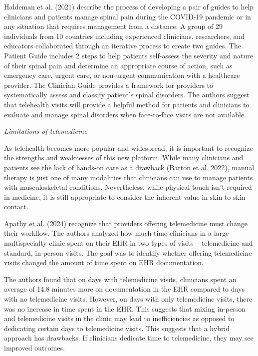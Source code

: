 \documentclass[
  letterpaper,
  DIV=11,
  numbers=noendperiod,
  oneside]{scrartcl}
\begin{document}
Haldeman et al. (2021) describe the process of developing a pair of
guides to help clinicians and patients manage spinal pain during the
COVID-19 pandemic or in any situation that requires management from a
distance. A group of 29 individuals from 10 countries including
experienced clinicians, researchers, and educators collaborated through
an iterative process to create two guides. The Patient Guide includes 2
steps to help patients self-assess the severity and nature of their
spinal pain and determine an appropriate course of action, such as
emergency care, urgent care, or non-urgent communication with a
healthcare provider. The Clinician Guide provides a framework for
providers to systematically assess and classify patient's spinal
disorders. The authors suggest that telehealth visits will provide a
helpful method for patients and clinicians to evaluate and manage spinal
disorders when face-to-face visits are not available.

\emph{Limitations of telemedicine}

As telehealth becomes more popular and widespread, it is important to
recognize the strengths and weaknesses of this new platform. While many
clinicians and patients see the lack of hands-on care as a drawback
(Barton et al. 2022), manual therapy is just one of many modalities that
clinicians can use to manage patients with musculoskeletal conditions.
Nevertheless, while physical touch isn't required in medicine, it is
still appropriate to consider the inherent value in skin-to-skin
contact.

Apathy et al. (2024) recognize that providers offering telemedicine must
change their workflow. The authors analyzed how much time clinicians in
a large multispecialty clinic spent on their EHR in two types of visits
-- telemedicine and standard, in-person visits. The goal was to identify
whether offering telemedicine visits changed the amount of time spent on
EHR documentation.

The authors found that on days with telemedicine visits, clinicians
spent an average of 14.8 minutes more on documentation in the EHR
compared to days with no telemedicine visits. However, on days with only
telemedicine visits, there was no increase in time spent in the EHR.
This suggests that mixing in-person and telemedicine visits in the
clinic may lead to inefficiencies as opposed to dedicating certain days
to telemedicine visits. This suggests that a hybrid approach has
drawbacks. If clinicians dedicate time to telemedicine, they may see
improved outcomes.
\end{document}
